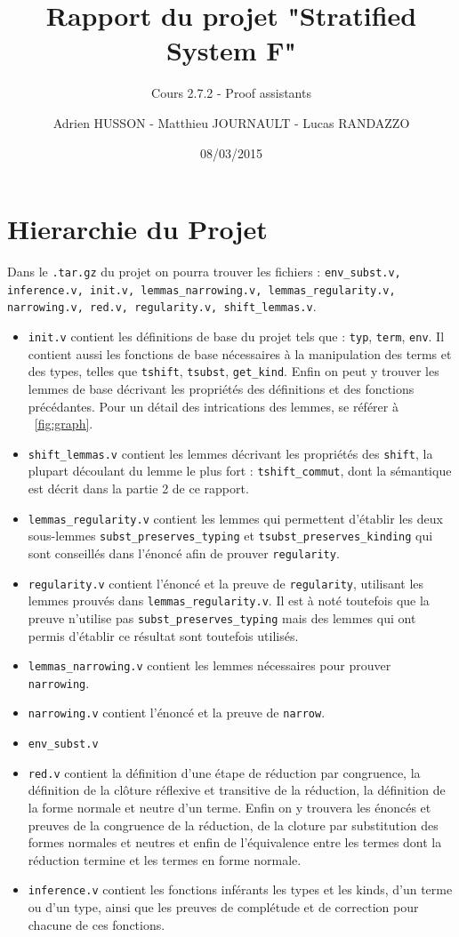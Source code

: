 \documentclass[a4paper,10pt]{scrartcl}
\title{Rapport du projet "Stratified System F"}
\subtitle{Cours 2.7.2 - Proof assistants}
\author{Adrien HUSSON - Matthieu JOURNAULT - Lucas RANDAZZO}
\date{08/03/2015}
\begin{document}
     \maketitle
     \tableofcontents
     \section{Hierarchie du Projet}
     Dans le \texttt{.tar.gz} du projet on pourra trouver les fichiers : \texttt{env\_subst.v, inference.v, init.v, lemmas\_narrowing.v, lemmas\_regularity.v, narrowing.v, red.v, regularity.v, shift\_lemmas.v}. 
     \begin{itemize}
      \item \texttt{init.v} contient les définitions de base du projet tels que : \texttt{typ}, \texttt{term}, \texttt{env}. Il contient aussi les fonctions de base nécessaires à la manipulation des terms et des types, telles que \texttt{tshift}, \texttt{tsubst}, \texttt{get\_kind}. Enfin on peut y trouver les lemmes de base décrivant les propriétés des définitions et des fonctions précédantes. Pour un détail des intrications des lemmes, se référer à ~\ref{fig:graph}.
      \item \texttt{shift\_lemmas.v} contient les lemmes décrivant les propriétés des \texttt{shift}, la plupart découlant du lemme le plus fort : \texttt{tshift\_commut}, dont la sémantique est décrit dans la partie 2 de ce rapport.
      \item \texttt{lemmas\_regularity.v} contient les lemmes qui permettent d'établir les deux sous-lemmes \texttt{subst\_preserves\_typing} et \texttt{tsubst\_preserves\_kinding} qui sont conseillés dans l'énoncé afin de prouver \texttt{regularity}.
      \item \texttt{regularity.v} contient l'énoncé et la preuve de \texttt{regularity}, utilisant les lemmes prouvés dans \texttt{lemmas\_regularity.v}. Il est à noté toutefois que la preuve n'utilise pas \texttt{subst\_preserves\_typing} mais des lemmes qui ont permis d'établir ce résultat sont toutefois utilisés.
      \item \texttt{lemmas\_narrowing.v} contient les lemmes nécessaires pour prouver \texttt{narrowing}.
      \item \texttt{narrowing.v} contient l'énoncé et la preuve de \texttt{narrow}.
      \item \texttt{env\_subst.v} 
      \item \texttt{red.v} contient la définition d'une étape de réduction par congruence, la définition de la clôture réflexive et transitive de la réduction, la définition de la forme normale et neutre d'un terme. Enfin on y trouvera les énoncés et preuves de la congruence de la réduction, de la cloture par substitution des formes normales et neutres et enfin de l'équivalence entre les termes dont la réduction termine et les termes en forme normale.
      \item \texttt{inference.v} contient les fonctions inférants les types et les kinds, d'un terme ou d'un type, ainsi que les preuves de complétude et de correction pour chacune de ces fonctions.
     \end{itemize}
\end{document}
